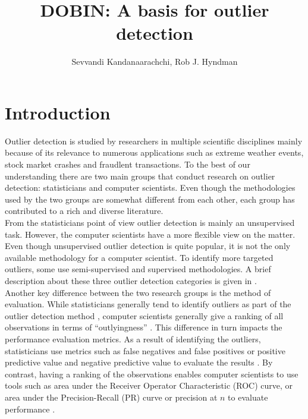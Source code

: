 \documentclass[11pt]{article}
\begin{document}
\title{DOBIN: A basis for outlier detection}
\author{Sevvandi Kandanaarachchi, Rob J. Hyndman}
\maketitle
{}

\section{Introduction}
Outlier detection is studied by researchers in multiple scientific disciplines mainly because of its relevance to numerous applications such as extreme weather events, stock market crashes and fraudlent transactions. To the best of our understanding there are two main groups that conduct research on outlier detection:  statisticians and computer scientists. Even though the methodologies used by the two groups are somewhat different from each other, each group has contributed to a rich and diverse literature. \\ 

From the statisticians point of view outlier detection is mainly an unsupervised task. However, the computer scientists have a more flexible view on the matter. Even though unsupervised outlier detection is quite popular, it is not the only  available methodology for a computer scientist.  To identify more targeted outliers, some use  semi-supervised and supervised methodologies. A brief description about these three outlier detection categories is given in \cite{goldstein2016comparative}. \\

Another key difference between the two research groups is the method of evaluation. While statisticians generally tend to identify outliers as part of the outlier detection method \citep{billor2000bacon, wilkinson2017visualizing, rousseeuw2018detecting}, computer scientists generally give a ranking of all observations in terms of ``outlyingness'' \citep{breunig2000lof, liu2008isolation, kriegel2009loop}. This difference in turn impacts the performance evaluation metrics. As a result of identifying the outliers, statisticians use metrics such as false negatives and  false positives or positive predictive value and negative predictive value to evaluate the results \citep{wilkinson2017visualizing}. By contrast,  having a ranking of the observations enables computer scientists to use tools such as area under the Receiver Operator Characteristic (ROC) curve, or area under the Precision-Recall (PR) curve or precision at $n$ to evaluate performance \citep{campos2016evaluation}. \\
\end{document}
